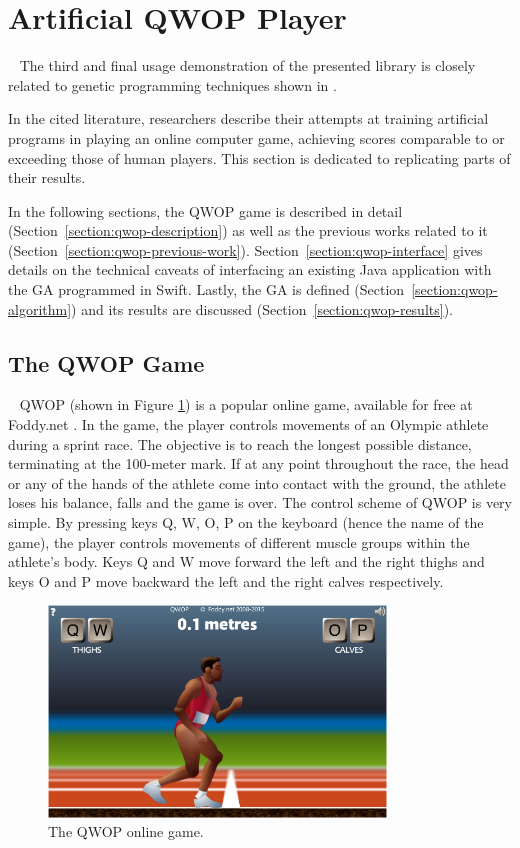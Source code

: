 \section{Artificial QWOP Player}~\label{section:qwop-player}
The third and final usage demonstration of the presented library is closely related to genetic programming techniques shown in \cite{EvolvingQwopGaits}.

In the cited literature, researchers describe their attempts at training artificial programs in playing an online computer game, achieving scores comparable to or exceeding those of human players. This section is dedicated to replicating parts of their results.

In the following sections, the QWOP game is described in detail (Section~\ref{section:qwop-description}) as well as the previous works related to it (Section~\ref{section:qwop-previous-work}). Section~\ref{section:qwop-interface} gives details on the technical caveats of interfacing an existing Java application with the GA programmed in Swift. Lastly, the GA is defined (Section~\ref{section:qwop-algorithm}) and its results are discussed (Section~\ref{section:qwop-results}).

\subsection{The QWOP Game}~\label{section:qwop-description}
QWOP (shown in Figure \ref{figure:QWOP}) is a popular online game, available for free at Foddy.net \cite{QwopWebsite}. In the game, the player controls movements of an Olympic athlete during a sprint race. The objective is to reach the longest possible distance, terminating at the 100-meter mark. If at any point throughout the race, the head or any of the hands of the athlete come into contact with the ground, the athlete loses his balance, falls and the game is over. The control scheme of QWOP is very simple. By pressing keys Q, W, O, P on the keyboard (hence the name of the game), the player controls movements of different muscle groups within the athlete's body. Keys Q and W move forward the left and the right thighs and keys O and P move backward the left and the right calves respectively.

\begin{figure}[ht]
	\centering
	\includegraphics[width=0.8\textwidth]{img/qwop.png}
	\caption[The QWOP online game.]{The QWOP online game. \cite{QwopWebsite}}
	\label{figure:QWOP}
\end{figure}

